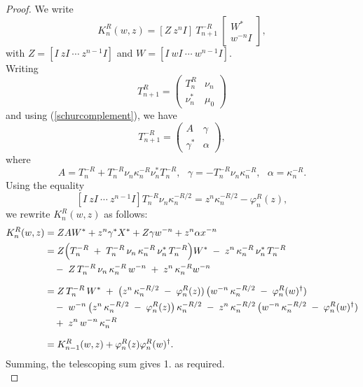 \documentclass[10pt,a4paper]{amsart}
\begin{document}
\begin{proof}
We write $$
K_{n}^{R}(w,z)=[Z ~ z^{n}I]~T_{n+1}^{-R}~\begin{bmatrix}
W^{*}\\
w^{-n}I
\end{bmatrix},
$$ with $Z=[I ~ zI ~\cdots ~ z^{n-1}I]$ and $W=[I ~ wI ~\cdots ~ w^{n-1}I]$.\\
Writing  
$$
T^{R}_{n+1}=
\begin{pmatrix}
T^{R}_{n} & \nu_{n}\\
\nu^{*}_{n} & \mu_{0}
\end{pmatrix}
$$ 
and using (\ref{schurcomplement}), we have 
$$
T^{-R}_{n+1}=
\begin{pmatrix}
A & \gamma\\
\gamma^{*} & \alpha
\end{pmatrix},
$$
where 
$$
A = T^{-R}_{n} + T^{-R}_{n}\nu_{n}\kappa_{n}^{-R}\nu_{n}^{*}T^{-R}_{n},~~~ \gamma = -T^{-R}_{n}\nu_{n}\kappa_{n}^{-R},~~~ \alpha = \kappa_{n}^{-R}.
$$
Using the equality 
$$
[I ~ zI ~\cdots ~ z^{n-1}I]T^{-R}_{n}\nu_{n}\kappa_{n}^{-R/2}
= z^{n}\kappa_{n}^{-R/2} - \varphi_{n}^{R}(z),
$$
we rewrite $K_{n}^{R}(w,z)$ as follows:
\begin{align*}
K_{n}^{R}(w,z)
&= ZAW^{*} + z^{n}\gamma^{*}X^{*}+Z\gamma w^{-n} + z^{n}\alpha x^{-n}\\
&= Z \Bigl(T_{n}^{-R} \;+\; T_{n}^{-R}\,\nu_{n}\,\kappa_{n}^{-R}\,\nu_{n}^{*}\,T_{n}^{-R}\Bigr) W^{*}
   \;-\; z^{n}\,\kappa_{n}^{-R}\,\nu_{n}^{*}\,T_{n}^{-R}\\
   \;& \quad -\; Z\,T_{n}^{-R}\,\nu_{n}\,\kappa_{n}^{-R}\,w^{-n}   
   \;+\; z^{n}\,\kappa_{n}^{-R} w^{-n}\, \\[6pt]
&= Z\,T_{n}^{-R}\,W^{*}
   \;+\;\bigl(z^{n}\,\kappa_{n}^{-R/2}\;-\;\varphi_{n}^{R}(z))\,
    \bigl(w^{-n}\,\kappa_{n}^{-R/2}\;-\;\varphi_{n}^R(w)^{\dag}) \\
&\quad -\;w^{-n}\,\bigl(z^{n}\,\kappa_{n}^{-R/2}\;-\;\varphi_{n}^{R}(z)\bigr)\,\kappa_{n}^{-R/2}
   \;-\;z^{n}\,\kappa_{n}^{-R/2}\,\bigl(w^{-n}\,\kappa_{n}^{-R/2}\;-\;\varphi_{n}^{R}(w)^{\dag}) \\
&\quad +\;z^{n}\,w^{-n}\,\kappa_{n}^{-R} \\[6pt]
&= K_{n-1}^{R}(w,z) + \varphi_{n}^{R}(z) \varphi_{n}^{R}(w)^{\dag}.
\end{align*}
Summing, the telescoping sum gives 1. as required.\\


\end{proof}
\end{document}
